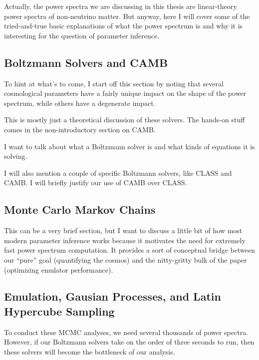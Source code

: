 \documentclass[11pt]{article}
\begin{document}
Actually, the power spectra we are discussing in this thesis are linear-theory power spectra of non-neutrino matter. But anyway, here I will cover some of the tried-and-true basic explanations of what the power spectrum is and why it is interesting for the question of parameter inference. 

\begin{centering}
\subsection{Boltzmann Solvers and CAMB}
\end{centering}

To hint at what's to come, I start off this section by noting that several cosmological parameters have a fairly unique impact on the shape of the power spectrum, while others have a degenerate impact. 

This is mostly just a theoretical discussion of these solvers. The hands-on stuff comes in the non-introductory section on CAMB.

I want to talk about what a Boltzmann solver is and what kinds of equations it is solving.

I will also mention a couple of specific Boltzmann solvers, like CLASS and CAMB. I will briefly justify our use of CAMB over CLASS.

\begin{centering}
\subsection{Monte Carlo Markov Chains}
\end{centering}

This can be a very brief section, but I want to discuss a little bit of how most modern parameter inference works because it motivates the need for extremely fast power spectrum computation. It provides a sort of conceptual bridge between our ``pure'' goal (quantifying the cosmos) and the nitty-gritty bulk of the paper (optimizing emulator performance).

\begin{centering}
\label{sec: state_of_the_art}
\subsection{Emulation, Gausian Processes, and Latin Hypercube Sampling}
\end{centering}

To conduct these MCMC analyses, we need several thousands of power spectra. However, if our Boltzmann solvers take on the order of three seconds to run, then these solvers will become the bottleneck of our analysis.
\end{document}
